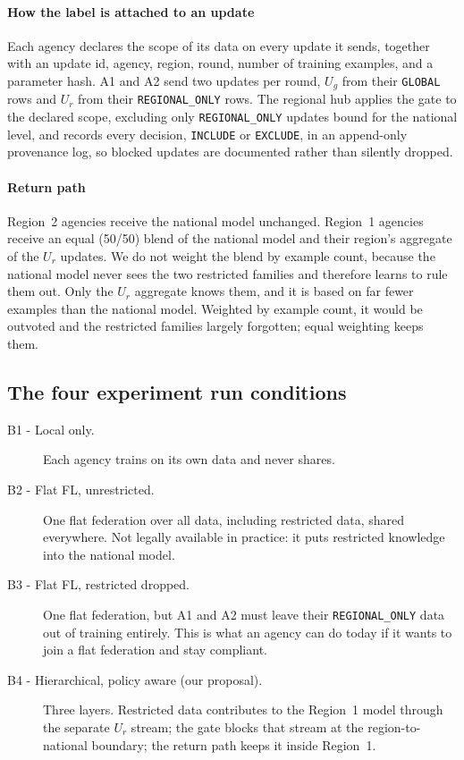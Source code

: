 \paragraph{How the label is attached to an update}
Each agency declares the scope of its data on every update it sends, together with an update id, agency, region, round, number of training examples, and a parameter hash. A1 and A2 send two updates per round, $U_g$ from their \texttt{GLOBAL} rows and $U_r$ from their \texttt{REGIONAL\_ONLY} rows. The regional hub applies the gate to the declared scope, excluding only \texttt{REGIONAL\_ONLY} updates bound for the national level, and records every decision, \texttt{INCLUDE} or \texttt{EXCLUDE}, in an append-only provenance log, so blocked updates are documented rather than silently dropped.

\paragraph{Return path}
Region~2 agencies receive the national model unchanged. Region~1 agencies receive an equal (50/50) blend of the national model and their region’s aggregate of the $U_r$ updates. We do not weight the blend by example count, because the national model never sees the two restricted families and therefore learns to rule them out. Only the $U_r$ aggregate knows them, and it is based on far fewer examples than the national model. Weighted by example count, it would be outvoted and the restricted families largely forgotten; equal weighting keeps them.

\subsection{The four experiment run conditions}
\label{sec:conditions}

\begin{description}
\item[B1 - Local only.] Each agency trains on its own data and never shares.

\item[B2 - Flat FL, unrestricted.] 
One flat federation over all data, including restricted data, shared everywhere. Not legally available in practice: it puts restricted knowledge into the national model.

\item[B3 - Flat FL, restricted dropped.] One flat federation, but A1 and A2
must leave their \texttt{REGIONAL\_ONLY} data out of training entirely. This is
what an agency can do today if it wants to join a flat federation and stay
compliant.

\item[B4 - Hierarchical, policy aware (our proposal).] Three layers.
Restricted data contributes to the Region~1 model through the separate
$U_r$ stream; the gate blocks that stream at the
region-to-national boundary; the return path keeps it inside Region~1.
\end{description}

